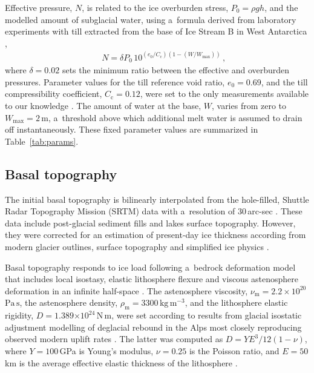 \documentclass{article}
\newcommand{\e}[1]{\ensuremath{\times 10^{#1}}}
\newcommand{\unit}[1]{\ensuremath{\mathrm{#1}}}
\begin{document}
    Effective pressure, $N$, is related to the ice overburden stress, $P_0=\rho
    gh$, and the modelled amount of subglacial water, using a~formula derived
    from laboratory experiments with till extracted from the base of Ice Stream
    B in West Antarctica \citep{Tulaczyk.etal.2000, Bueler.Pelt.2015},
%
\begin{align}
&\label{eqn:ntil}
&N = \delta P_0 \, 10^{(e_0/C_{\mathrm{c}}) (1 - (W/W_{\text{max}}))} \,,
\end{align}
%
    where $\delta=0.02$ sets the minimum ratio between the effective and
    overburden pressures. Parameter values for the till reference void ratio,
    $e_0=0.69$, and the till compressibility coefficient,
    $C_{\mathrm{c}}=0.12$, were set to the only measurements available to our
    knowledge \citep{Tulaczyk.etal.2000}. The amount of water at the base, $W$,
    varies from zero to $W_{\text{max}}=2$\,m, a~threshold above which
    additional melt water is assumed to drain off instantaneously. These fixed
    parameter values are summarized in Table~\ref{tab:params}.

\subsection{Basal topography}
\label{sec:bedrock}

    The initial basal topography is bilinearly interpolated from the
    hole-filled, Shuttle Radar Topography Mission (SRTM) data with a~resolution
    of 30\,arc-sec \citep{Jarvis.etal.2008}. These data include post-glacial
    sediment fills and lakes surface topography. However, they were corrected
    for an estimation of present-day ice thickness according from modern
    glacier outlines, surface topography and simplified ice physics
    \citep{Huss.Farinotti.2012}.

    Basal topography responds to ice load following a~bedrock deformation model
    that includes local isostasy, elastic lithosphere flexure and viscous
    astenosphere deformation in an infinite half-space
    \citep{Lingle.Clark.1985,Bueler.etal.2007}. The astenosphere viscosity,
    $\nu_{\mathrm{m}}=2.2\times10^{20}$\,\unit{Pa\,s}, the astenosphere
    density, $\rho_{\mathrm{m}}=3300$\,\unit{kg\,m^{-3}}, and the lithosphere
    elastic rigidity, $D=1.389\e{24}$\,\unit{N\,m}, were set according to
    results from glacial isostatic adjustment modelling of deglacial rebound in
    the Alps most closely reproducing observed modern uplift rates
    \citep[Table~\ref{tab:params};][Supplementary Fig.~7]{Mey.etal.2016}. The
    latter was computed as $D=YE^3/12(1-\nu)$, where $Y=100$\,GPa is Young's
    modulus, $\nu=0.25$ is the Poisson ratio, and $E=50$\,km is the average
    effective elastic thickness of the lithosphere
    \citep[Table~\ref{tab:params};][]{Mey.etal.2016}.
\end{document}
